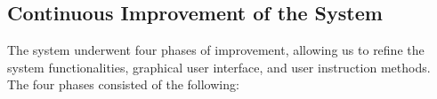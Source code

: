 


\subsection{Continuous Improvement of the System}
The system underwent four phases of improvement, allowing us to refine the system functionalities, graphical user interface, and user instruction methods.
The four phases consisted of the following:

